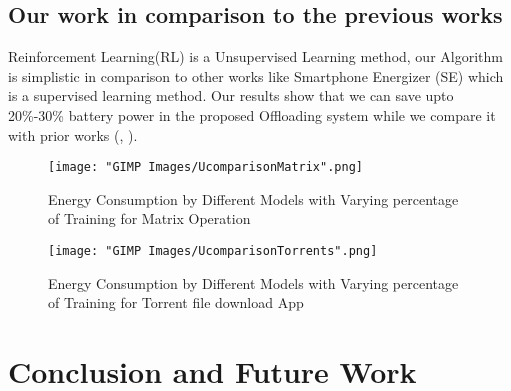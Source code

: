 \documentclass{report}
\begin{document}
\section{Our work in comparison to the previous works}
Reinforcement Learning(RL) is a Unsupervised Learning method, our Algorithm is simplistic in comparison to other works like Smartphone Energizer (SE) \cite{khairy2013smartphone} which is a supervised learning method. Our results show that we can save upto 20\%-30\% battery power in the proposed Offloading system while we compare it with prior works (\cite{khairy2013smartphone}, \cite{flores2013adaptive}). 
\begin{figure}[h]
  \centering
  \texttt{[image: "GIMP Images/UcomparisonMatrix".png]}
  \caption{Energy Consumption by Different Models with Varying percentage of Training for Matrix Operation}
  \label{fig:EnergyConsumptionDiffModelsMatrix}
\end{figure}

\begin{figure}[h]
  \centering
  \texttt{[image: "GIMP Images/UcomparisonTorrents".png]}
  \caption{Energy Consumption by Different Models with Varying percentage of Training for Torrent file download App}
  \label{fig:EnergyConsumptionDiffModelsTorrent}
\end{figure}
\chapter{Conclusion and Future Work}


\end{document}
